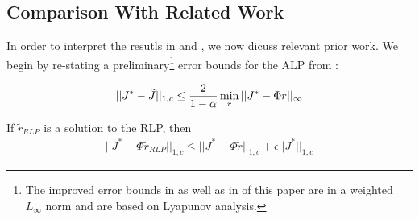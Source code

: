 \subsection{Comparison With Related Work}
In order to interpret the resutls in  and , we now dicuss relevant prior work. We begin by re-stating a preliminary\footnote{The improved error bounds in \cite{ALP} as well as in  of this paper are in a weighted $L_\infty$ norm and are based on Lyapunov analysis.} error bounds for the ALP from \cite{ALP}:
\begin{theorem}\label{alpvanilla}
\begin{align*}
||J^*-\tilde{J}||_{1,c}\leq \frac{2}{1-\alpha}\min_{r}||J^*-\Phi r||_\infty
\end{align*}
\end{theorem}
\begin{comment}

The ALP is a linear program in $k$ ($<<n$) variables as opposed to the LP in \eqref{mdplp} which has $n$ variables.
Nevertheless, the ALP has $nd$ constraints (same as the LP) which is an issue when $n$ is large and calls for constraint approximation/reduction techniques.

Most works in literature make use of the underlying structure of the problem to cleverly reduce the number of constraints of the ALP. A good example is \cite{gkp}, wherein the structure in factored linear functions is exploited. The use of basis function also helps constraint reduction in \cite{Mor-Kum}. In \cite{ALP-Bor}, the constraints are approximated indirectly by approximating the square of the Lagrange multipliers. In \cite{petrik} the transitional error is reduced ignoring the representational and sampling errors.\par
\end{comment}
\begin{theorem}\label{rlpt}
If $\tilde{r}_{RLP}$ is a solution to the RLP, then
\begin{align*}
||J^*-\Phi\tilde{r}_{RLP}||_{1,c}\leq ||J^*-\Phi\tilde{r}||_{1,c}+\epsilon ||J^*||_{1,c}
\end{align*}
\end{theorem}
